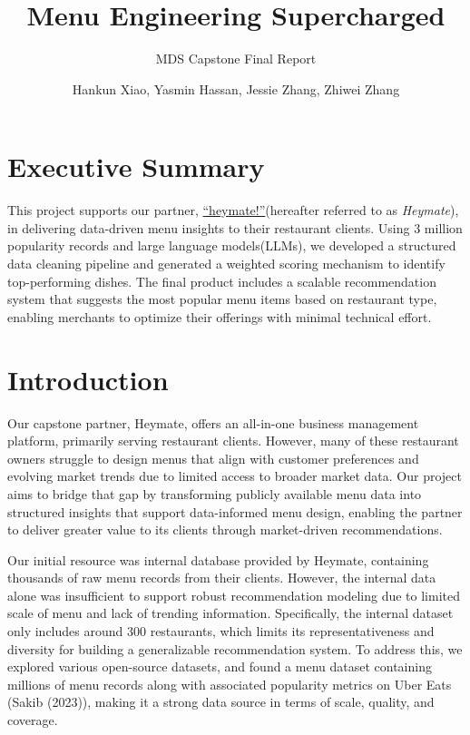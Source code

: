\documentclass[
  11pt,
  a4paper,
  DIV=11,
  numbers=noendperiod]{scrartcl}
\title{Menu Engineering Supercharged}
\subtitle{MDS Capstone Final Report}
\author{Hankun Xiao, Yasmin Hassan, Jessie Zhang, Zhiwei Zhang}
\date{}
\renewcommand*\contentsname{Table of contents}
\newcommand\contentsname{Table of contents}
\begin{document}
\maketitle

\renewcommand*\contentsname{Table of contents}
{
\hypersetup{linkcolor=}
\setcounter{tocdepth}{2}
\tableofcontents
}

\section{Executive Summary}\label{executive-summary}

This project supports our partner,
\href{https://www.heymate.ca}{``heymate!''}(hereafter referred to as
\emph{Heymate}), in delivering data-driven menu insights to their
restaurant clients. Using 3 million popularity records and large
language models(LLMs), we developed a structured data cleaning pipeline
and generated a weighted scoring mechanism to identify top-performing
dishes. The final product includes a scalable recommendation system that
suggests the most popular menu items based on restaurant type, enabling
merchants to optimize their offerings with minimal technical effort.

\section{Introduction}\label{introduction}

Our capstone partner, Heymate, offers an all-in-one business management
platform, primarily serving restaurant clients. However, many of these
restaurant owners struggle to design menus that align with customer
preferences and evolving market trends due to limited access to broader
market data. Our project aims to bridge that gap by transforming
publicly available menu data into structured insights that support
data-informed menu design, enabling the partner to deliver greater value
to its clients through market-driven recommendations.

Our initial resource was internal database provided by Heymate,
containing thousands of raw menu records from their clients. However,
the internal data alone was insufficient to support robust
recommendation modeling due to limited scale of menu and lack of
trending information. Specifically, the internal dataset only includes
around 300 restaurants, which limits its representativeness and
diversity for building a generalizable recommendation system. To address
this, we explored various open-source datasets, and found a menu dataset
containing millions of menu records along with associated popularity
metrics on Uber Eats (Sakib (2023)), making it a strong data source in
terms of scale, quality, and coverage.
\end{document}

